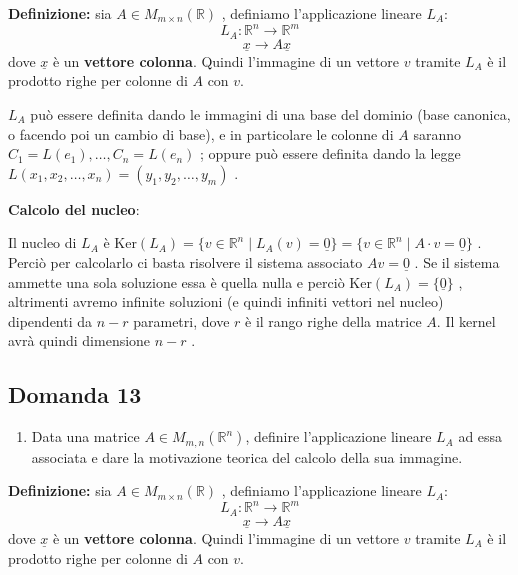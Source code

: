 \documentclass[
  a4paper,
]{article}
\providecommand{\tightlist}{%
  \setlength{\itemsep}{0pt}\setlength{\parskip}{0pt}}
\providecommand{\tightlist}{}
\begin{document}
\textbf{Definizione:} sia \(A \in M_{m\times n}(\mathbb{R})\) ,
definiamo l'applicazione lineare \(L_A\): \[
L_A : \mathbb{R}^n \to \mathbb{R}^m
\] \[
\quad\underline{x} \to A\underline{x}
\] dove \(\underline{x}\) è un \textbf{vettore colonna}. Quindi
l'immagine di un vettore \(v\) tramite \(L_A\) è il prodotto righe per
colonne di \(A\) con \(v\).

\(L_A\) può essere definita dando le immagini di una base del dominio
(base canonica, o facendo poi un cambio di base), e in particolare le
colonne di \(A\) saranno \(C_1 = L(e_1), \dots, C_n = L(e_n)\) ; oppure
può essere definita dando la legge
\(L(x_1, x_2, \dots, x_n) = (y_1, y_2, \dots, y_m)\) .

\textbf{Calcolo del nucleo}:

Il nucleo di \(L_A\) è
\(\text{Ker}(L_A) = \{v \in \mathbb{R}^n \mid L_A(v) = \underline{0}\} = \{v \in \mathbb{R}^n \mid A\cdot v = \underline{0}\}\)
. Perciò per calcolarlo ci basta risolvere il sistema associato
\(Av = \underline{0}\) . Se il sistema ammette una sola soluzione essa è
quella nulla e perciò \(\text{Ker}(L_A) = \{\underline{0}\}\) ,
altrimenti avremo infinite soluzioni (e quindi infiniti vettori nel
nucleo) dipendenti da \(n - r\) parametri, dove \(r\) è il rango righe
della matrice \(A\). Il kernel avrà quindi dimensione \(n - r\) .

\hypertarget{domanda-13}{%
\subsection{Domanda 13}\label{domanda-13}}

\begin{observationbox}[Domanda]
\begin{enumerate}
\def\labelenumi{\arabic{enumi}.}
\setcounter{enumi}{12}
\tightlist
\item
  Data una matrice \(A\in M_{m,n}(\mathbb{R}^n)\), definire
  l'applicazione lineare \(L_A\) ad essa associata e dare la motivazione
  teorica del calcolo della sua immagine.
\end{enumerate}
\end{observationbox}

\textbf{Definizione:} sia \(A \in M_{m\times n}(\mathbb{R})\) ,
definiamo l'applicazione lineare \(L_A\): \[
L_A : \mathbb{R}^n \to \mathbb{R}^m
\] \[
\quad\underline{x} \to A\underline{x}
\] dove \(\underline{x}\) è un \textbf{vettore colonna}. Quindi
l'immagine di un vettore \(v\) tramite \(L_A\) è il prodotto righe per
colonne di \(A\) con \(v\).
\end{document}
